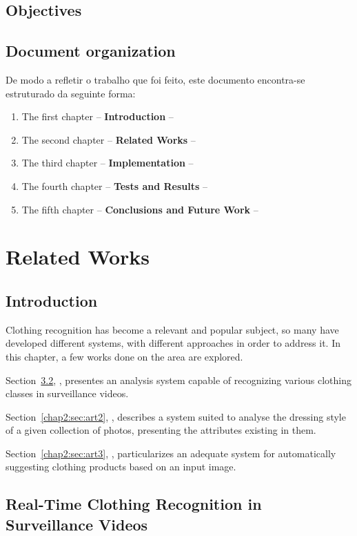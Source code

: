 \documentclass[titlepage,12pt,a4paper,times]{book}
\begin{document}
\section{Objectives}
\label{sec:obj}

\section{Document organization}
\label{sec:organ}
De modo a refletir o trabalho que foi feito, este documento encontra-se
estruturado da seguinte forma:
\begin{enumerate}
\item The first chapter -- \textbf{Introduction} --
\item The second chapter -- \textbf{Related Works} --
\item The third chapter -- \textbf{Implementation} --
\item The fourth chapter -- \textbf{Tests and Results} --
\item The fifth chapter -- \textbf{Conclusions and Future Work} --
\end{enumerate}

\chapter{Related Works}
\label{chap:ow}

\section{Introduction}
\label{chap2:sec:intro}

Clothing recognition has become a relevant and popular subject, so many have
developed different systems, with different approaches in order to address it.
In this chapter, a few works done on the area are explored.

Section~\ref{chap2:sec:art1}, , presentes an
analysis system capable of recognizing various clothing classes in surveillance
videos.

Section~\ref{chap2:sec:art2}, , describes a system
suited to analyse the dressing style of a given collection of photos,
presenting the attributes existing in them.

Section~\ref{chap2:sec:art3}, , particularizes an
adequate system for automatically suggesting clothing products based on an
input image.

\section{Real-Time Clothing Recognition in Surveillance Videos}
\label{chap2:sec:art1}
\end{document}
